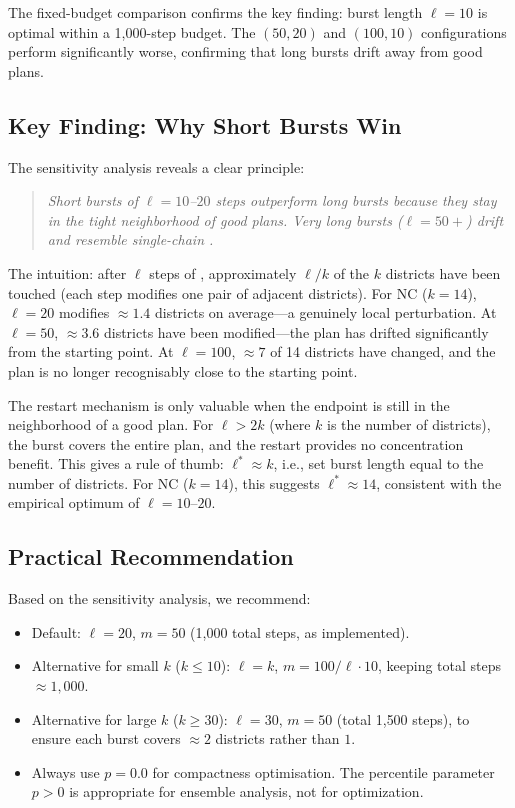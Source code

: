 The fixed-budget comparison confirms the key finding: burst length
$\ell = 10$ is optimal within a 1{,}000-step budget.
The $(50, 20)$ and $(100, 10)$ configurations perform significantly
worse, confirming that long bursts drift away from good plans.

\subsection{Key Finding: Why Short Bursts Win}

The sensitivity analysis reveals a clear principle:

\begin{quote}
\textit{Short bursts of $\ell = 10$--$20$ steps outperform long bursts
because they stay in the tight neighborhood of good plans.
Very long bursts ($\ell = 50+$) drift and resemble single-chain \recom{}.}
\end{quote}

The intuition: after $\ell$ steps of \recom{}, approximately $\ell/k$
of the $k$ districts have been touched (each step modifies one pair of
adjacent districts).
For NC ($k = 14$), $\ell = 20$ modifies $\approx 1.4$ districts on
average---a genuinely local perturbation.
At $\ell = 50$, $\approx 3.6$ districts have been modified---the plan
has drifted significantly from the starting point.
At $\ell = 100$, $\approx 7$ of 14 districts have changed, and the
plan is no longer recognisably close to the starting point.

The restart mechanism is only valuable when the endpoint is still in
the neighborhood of a good plan.
For $\ell > 2k$ (where $k$ is the number of districts), the burst
covers the entire plan, and the restart provides no concentration benefit.
This gives a rule of thumb: $\ell^* \approx k$, i.e., set burst length
equal to the number of districts.
For NC ($k = 14$), this suggests $\ell^* \approx 14$, consistent with
the empirical optimum of $\ell = 10$--$20$.

\subsection{Practical Recommendation}

Based on the sensitivity analysis, we recommend:
\begin{itemize}
\item Default: $\ell = 20$, $m = 50$ (1{,}000 total steps, as implemented).
\item Alternative for small $k$ ($k \leq 10$): $\ell = k$, $m = 100 / \ell \cdot 10$,
      keeping total steps $\approx 1{,}000$.
\item Alternative for large $k$ ($k \geq 30$): $\ell = 30$, $m = 50$
      (total 1{,}500 steps), to ensure each burst covers $\approx 2$
      districts rather than $1$.
\item Always use $p = 0.0$ for compactness optimisation.
      The percentile parameter $p > 0$ is appropriate for ensemble analysis,
      not for optimization.
\end{itemize}
